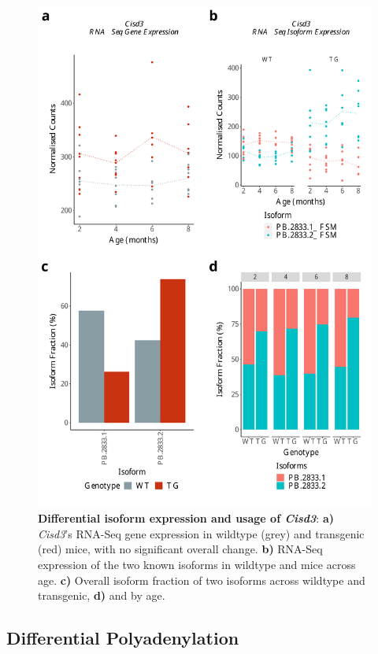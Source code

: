 \begin{figure}[htp]
	\begin{center}
		\includegraphics[page=1,scale = 0.55]{Figures/DIU_notDEG_major.pdf}
	\end{center}
	\captionsetup{width=0.95\textwidth}
	\caption[Differential isoform expression and usage of \textit{Cisd3}]%
	{\textbf{Differential isoform expression and usage of \textit{Cisd3}}: \textbf{a)} \textit{Cisd3}'s RNA-Seq gene expression in wildtype (grey) and transgenic (red) mice, with no significant overall change. \textbf{b)} RNA-Seq expression of the two known isoforms in wildtype and mice across age. \textbf{c)} Overall isoform fraction of two isoforms across wildtype and transgenic, \textbf{d)} and by age.}    
	\label{fig:DIU_Cisd3}
\end{figure}




\clearpage
\subsection{Differential Polyadenylation}

